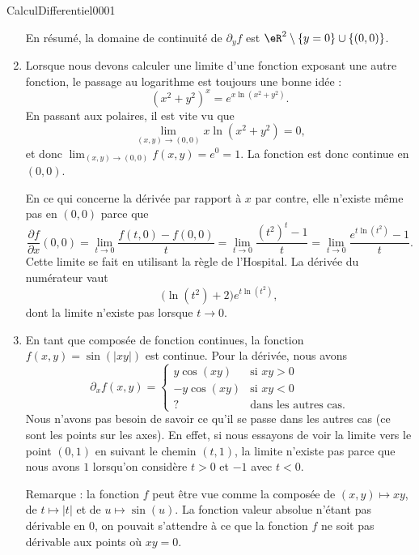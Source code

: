 \begin{corrige}{CalculDifferentiel0001}
\begin{enumerate}
			En résumé, la domaine de continuité de $\partial_yf$ est $\eR^2\setminus\{ y=0 \}\cup\{ (0,0) \}$.
			
			

		\item
			Lorsque nous devons calculer une limite d'une fonction exposant une autre fonction, le passage au logarithme est toujours une bonne idée : 
			\begin{equation}
				(x^2+y^2)^x= e^{x\ln(x^2+y^2)}.
			\end{equation}
			En passant aux polaires, il est vite vu que
			\begin{equation}
				\lim_{(x,y)\to(0,0)}x\ln(x^2+y^2)=0,
			\end{equation}
			et donc $\lim_{(x,y)\to(0,0)}f(x,y)=e^0=1$. La fonction est donc continue en $(0,0)$.

			En ce qui concerne la dérivée par rapport à $x$ par contre, elle n'existe même pas en $(0,0)$ parce que
			\begin{equation}
				\frac{ \partial f }{ \partial x }(0,0)=\lim_{t\to 0} \frac{ f(t,0)-f(0,0) }{ t }=\lim_{t\to 0} \frac{ (t^2)^t-1 }{ t }=\lim_{t\to 0} \frac{  e^{t\ln(t^2)}-1 }{ t }.
			\end{equation}
			Cette limite se fait en utilisant la règle de l'Hospital. La dérivée du numérateur vaut
			\begin{equation}
				\big( \ln(t^2)+2 \big) e^{t\ln(t^2)},
			\end{equation}
			dont la limite n'existe pas lorsque $t\to 0$.

		\item
			En tant que composée de fonction continues, la fonction $f(x,y)=\sin(| xy |)$ est continue. Pour la dérivée, nous avons
			\begin{equation}
				\partial_xf(x,y)=
				\begin{cases}
					y\cos(xy)	&	\text{si $xy>0$}\\
					-y\cos(xy)	&	\text{si $xy<0$}\\
					?		&	\text{dans les autres cas}.
				\end{cases}
			\end{equation}
			Nous n'avons pas besoin de savoir ce qu'il se passe dans les autres cas (ce sont les points sur les axes). En effet, si nous essayons de voir la limite vers le point $(0,1)$ en suivant le chemin $(t,1)$, la limite n'existe pas parce que nous avons $1$ lorsqu'on considère $t>0$ et $-1$ avec $t<0$.

			Remarque : la fonction $f$ peut être vue comme la composée de $(x,y)\mapsto xy$, de $t\mapsto| t |$ et de $u\mapsto\sin(u)$. La fonction valeur absolue n'étant pas dérivable en $0$, on pouvait s'attendre à ce que la fonction $f$ ne soit pas dérivable aux points où $xy=0$.


\end{enumerate}
\end{corrige}
